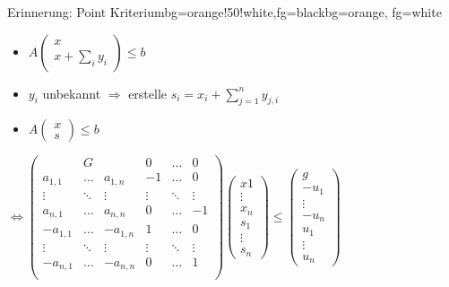 \begin{frame}
	\begin{variableblock}{Erinnerung: Point Kriterium}{bg=orange!50!white,fg=black}{bg=orange, fg=white}
		\begin{itemize}
			\setlength{\itemindent}{1cm}
			\item[(point)] $A\begin{pmatrix} x \\ x + \sum_i y_i \end{pmatrix} \le b$
		\end{itemize}
	\end{variableblock}
	\begin{itemize}
		\item $y_i$ unbekannt $\Rightarrow$ erstelle $s_i=x_i+\sum_{j=1}^n y_{j,i}$
		\item $A\begin{pmatrix} x \\ s \end{pmatrix} \le b$ \newline
	\end{itemize}
	$\Leftrightarrow \begin{pmatrix}
	& G 		& 			& 0 	 & \dots  & 0 \\
	a_{1,1}  & \dots 	& a_{1,n}	& -1 	 & \dots  & 0 \\
	\vdots   & \ddots 	& \vdots	& \vdots & \ddots & \vdots \\
	a_{n,1}  & \dots 	& a_{n,n}	& 0 	 & \dots  & -1 \\
	-a_{1,1} & \dots 	& -a_{1,n}	& 1 	 & \dots  & 0 \\
	\vdots   & \ddots 	& \vdots	& \vdots & \ddots & \vdots \\
	-a_{n,1} & \dots 	& -a_{n,n}	& 0 	 & \dots  & 1 \\
	\end{pmatrix} \begin{pmatrix} x1 \\ \vdots \\ x_n \\ s_1 \\ \vdots \\ s_n\end{pmatrix} \le \begin{pmatrix} g \\ -u_1 \\ \vdots\\ -u_n \\ u_1 \\ \vdots \\ u_n \end{pmatrix}$\\ %
\end{frame}


